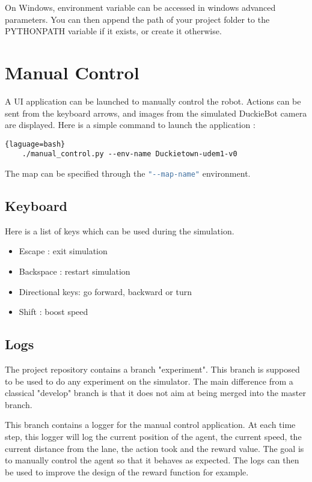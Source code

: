 On Windows, environment variable can be accessed in windows advanced parameters. You can then append the path of your project folder to the PYTHONPATH variable if it exists, or create it otherwise.

\section{Manual Control}
A UI application can be launched to manually control the robot.
Actions can be sent from the keyboard arrows, and images from the simulated DuckieBot camera are displayed.
Here is a simple command to launch the application :

\begin{lstlisting}{laguage=bash}
    ./manual_control.py --env-name Duckietown-udem1-v0
\end{lstlisting}

The map can be specified through the \lstinline[language=bash]+"--map-name"+ environment.

\subsection{Keyboard}
Here is a list of keys which can be used during the simulation.

\begin{itemize}
	\item Escape : exit simulation
	\item Backspace : restart simulation
	\item Directional keys: go forward, backward or turn
	\item Shift : boost speed
\end{itemize}

\subsection{Logs}
The project repository\cite{forked_gym_duckietown} contains a branch "experiment".
This branch is supposed to be used to do any experiment on the simulator.
The main difference from a classical "develop" branch is that it does not aim at being merged into the master branch.

This branch contains a logger for the manual control application.
At each time step, this logger will log the current position of the agent, the current speed, the current distance from the lane, the action took and the reward value.
The goal is to manually control the agent so that it behaves as expected.
The logs can then be used to improve the design of the reward function for example.

